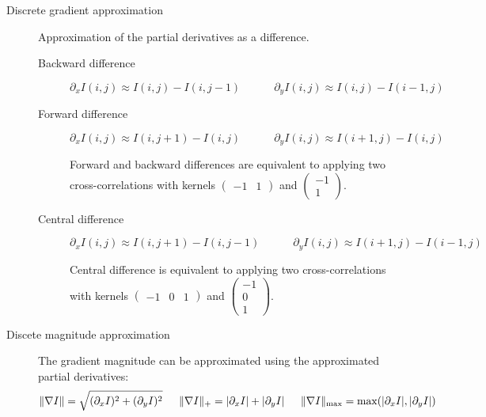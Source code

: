 \begin{description}
    \item[Discrete gradient approximation] 
        Approximation of the partial derivatives as a difference.
        \begin{description}
            \item[Backward difference] 
                \[ \partial_x I(i, j) \approx I(i, j) - I(i, j-1) \hspace{3em} \partial_y I(i, j) \approx I(i, j) - I(i-1, j) \]


            \item[Forward difference] 
                \[ \partial_x I(i, j) \approx I(i, j+1) - I(i, j) \hspace{3em} \partial_y I(i, j) \approx I(i+1, j) - I(i, j) \]

            \begin{remark}
                Forward and backward differences are equivalent to applying two cross-correlations with kernels 
                $\begin{pmatrix} -1 & 1 \end{pmatrix}$ and $\begin{pmatrix} -1 \\ 1 \end{pmatrix}$.
            \end{remark}

            \item[Central difference] 
                \[ \partial_x I(i, j) \approx I(i, j+1) - I(i, j-1) \hspace{3em} \partial_y I(i, j) \approx I(i+1, j) - I(i-1, j) \]
                
                \begin{remark}
                    Central difference is equivalent to applying two cross-correlations with kernels 
                    $\begin{pmatrix} -1 & 0 & 1 \end{pmatrix}$ and $\begin{pmatrix} -1 \\ 0 \\ 1 \end{pmatrix}$.
                \end{remark}
        \end{description}

    \item[Discete magnitude approximation] 
        The gradient magnitude can be approximated using the approximated partial derivatives:
        \[ 
            \Vert \nabla I \Vert = \sqrt{(\partial_x I)^2 + (\partial_y I)^2} \hspace{1.5em}
            \Vert \nabla I \Vert_+ = \vert \partial_x I \vert + \vert \partial_y I \vert \hspace{1.5em}
            \Vert \nabla I \Vert_\text{max} = \max(\vert \partial_x I \vert, \vert \partial_y I \vert)
        \]


\end{description}

